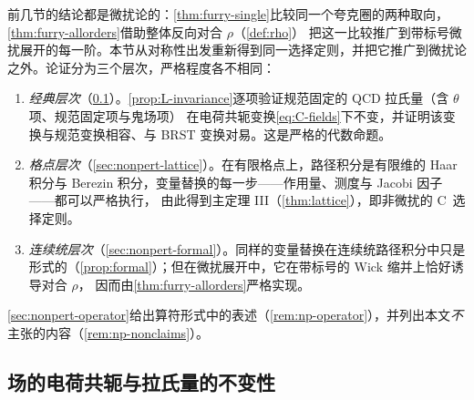 \documentclass[UTF8,a4paper,11pt,fontset=fandol]{ctexart}
\theoremstyle{cplain}
\theoremstyle{cdefinition}
\theoremstyle{cremark}
\numberwithin{equation}{section}
\begin{document}
前几节的结论都是微扰论的：\cref{thm:furry-single}比较同一个夸克圈的两种取向，\cref{thm:furry-allorders}借助整体反向对合 $\rho$（\cref{def:rho}）
把这一比较推广到带标号微扰展开的每一阶。本节从对称性出发重新得到同一选择定则，并把它推广到微扰论之外。论证分为三个层次，严格程度各不相同：
\begin{enumerate}[label=(\arabic*),leftmargin=2.2em,itemsep=1pt,topsep=2pt]
\item \emph{经典层次}（\cref{sec:nonpert-lagrangian}）。\cref{prop:L-invariance}逐项验证规范固定的 QCD 拉氏量（含 $\theta$ 项、规范固定项与鬼场项）
在电荷共轭变换\cref{eq:C-fields}下不变，并证明该变换与规范变换相容、与 BRST 变换对易。这是严格的代数命题。
\item \emph{格点层次}（\cref{sec:nonpert-lattice}）。在有限格点上，路径积分是有限维的 Haar 积分与 Berezin 积分，变量替换的每一步——作用量、测度与 Jacobi 因子——都可以严格执行，
由此得到主定理 III（\cref{thm:lattice}），即非微扰的 C~选择定则。
\item \emph{连续统层次}（\cref{sec:nonpert-formal}）。同样的变量替换在连续统路径积分中只是形式的（\cref{prop:formal}）；但在微扰展开中，它在带标号的 Wick 缩并上恰好诱导对合 $\rho$，
因而由\cref{thm:furry-allorders}严格实现。
\end{enumerate}
\cref{sec:nonpert-operator}给出算符形式中的表述（\cref{rem:np-operator}），并列出本文\emph{不}主张的内容（\cref{rem:np-nonclaims}）。

\subsection{场的电荷共轭与拉氏量的不变性}\label{sec:nonpert-lagrangian}
\end{document}

